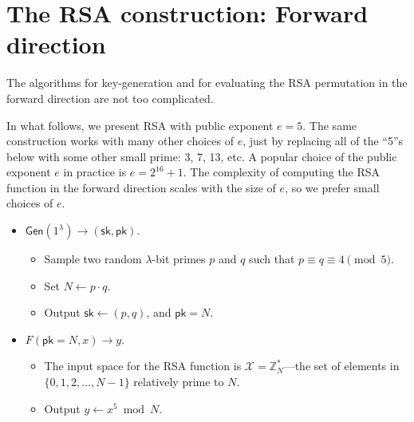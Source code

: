 \documentclass[
  letterpaper,
]{scrbook}
\providecommand{\tightlist}{%
  \setlength{\itemsep}{0pt}\setlength{\parskip}{0pt}}
\newcommand{\Z}{\mathbb{Z}}
\newcommand{\calX}{\mathcal{X}}
\newcommand{\Gen}{\mathsf{Gen}}
\newcommand{\sk}{\mathsf{sk}}
\newcommand{\pk}{\mathsf{pk}}
\theoremstyle{definition}
\theoremstyle{plain}
\theoremstyle{plain}
\theoremstyle{remark}
\begin{document}
\section{The RSA construction: Forward
direction}\label{the-rsa-construction-forward-direction}

The algorithms for key-generation and for evaluating the RSA permutation
in the forward direction are not too complicated.

In what follows, we present RSA with public exponent \(e=5\). The same
construction works with many other choices of \(e\), just by replacing
all of the ``5''s below with some other small prime: 3, 7, 13, etc. A
popular choice of the public exponent \(e\) in practice is
\(e=2^{16}+1\). The complexity of computing the RSA function in the
forward direction scales with the size of \(e\), so we prefer small
choices of \(e\).

\begin{itemize}
\item
  \(\Gen(1^\lambda) \to (\sk, \pk)\).


  \begin{itemize}
  \item
    Sample two random \(\lambda\)-bit primes \(p\) and \(q\) such that
    \(p \equiv q \equiv 4 \pmod 5\).

  \item
    Set \(N \gets p \cdot q\).
  \item
    Output \(\sk \gets (p, q)\), and \(\pk = N\).
  \end{itemize}
\item
  \(F(\pk = N, x) \to y\).

  \begin{itemize}
  \tightlist
  \item
    The input space for the RSA function is \(\calX = \Z^*_N\)---the set
    of elements in \(\{0, 1, 2, \dots, N-1\}\) relatively prime to
    \(N\).
  \item
    Output \(y \gets x^5 \bmod N\).
  \end{itemize}
\end{itemize}
\end{document}
